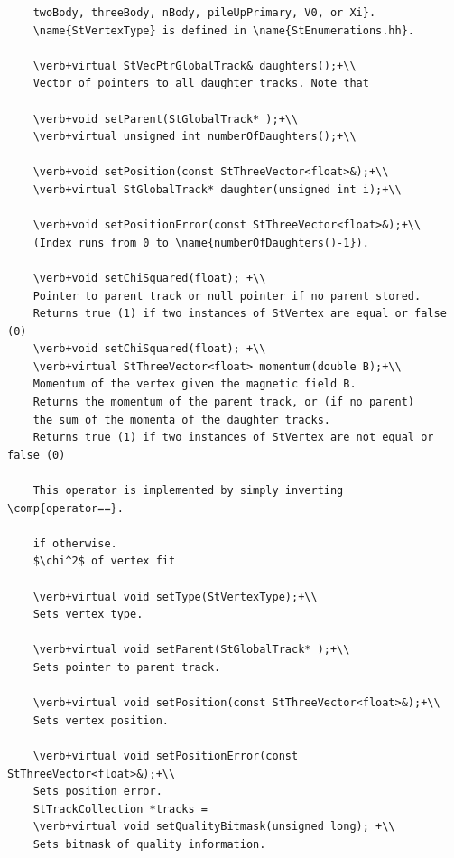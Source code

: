 \begin{Entry}
\begin{Entry}
{\begin{verbatim}
    twoBody, threeBody, nBody, pileUpPrimary, V0, or Xi}.
    \name{StVertexType} is defined in \name{StEnumerations.hh}.
    
    \verb+virtual StVecPtrGlobalTrack& daughters();+\\
    Vector of pointers to all daughter tracks. Note that
    
    \verb+void setParent(StGlobalTrack* );+\\
    \verb+virtual unsigned int numberOfDaughters();+\\
    
    \verb+void setPosition(const StThreeVector<float>&);+\\
    \verb+virtual StGlobalTrack* daughter(unsigned int i);+\\
    
    \verb+void setPositionError(const StThreeVector<float>&);+\\
    (Index runs from 0 to \name{numberOfDaughters()-1}).
    
    \verb+void setChiSquared(float); +\\    
    Pointer to parent track or null pointer if no parent stored.
    Returns true (1) if two instances of StVertex are equal or false (0)
    \verb+void setChiSquared(float); +\\
    \verb+virtual StThreeVector<float> momentum(double B);+\\
    Momentum of the vertex given the magnetic field B.
    Returns the momentum of the parent track, or (if no parent)
    the sum of the momenta of the daughter tracks.
    Returns true (1) if two instances of StVertex are not equal or false (0)
       
    This operator is implemented by simply inverting \comp{operator==}.

    if otherwise. 
    $\chi^2$ of vertex fit
    
    \verb+virtual void setType(StVertexType);+\\
    Sets vertex type.

    \verb+virtual void setParent(StGlobalTrack* );+\\
    Sets pointer to parent track.

    \verb+virtual void setPosition(const StThreeVector<float>&);+\\
    Sets vertex position.

    \verb+virtual void setPositionError(const StThreeVector<float>&);+\\
    Sets position error.
    StTrackCollection *tracks = 
    \verb+virtual void setQualityBitmask(unsigned long); +\\
    Sets bitmask of quality information.


\end{verbatim}}
\end{Entry}
\end{Entry}
